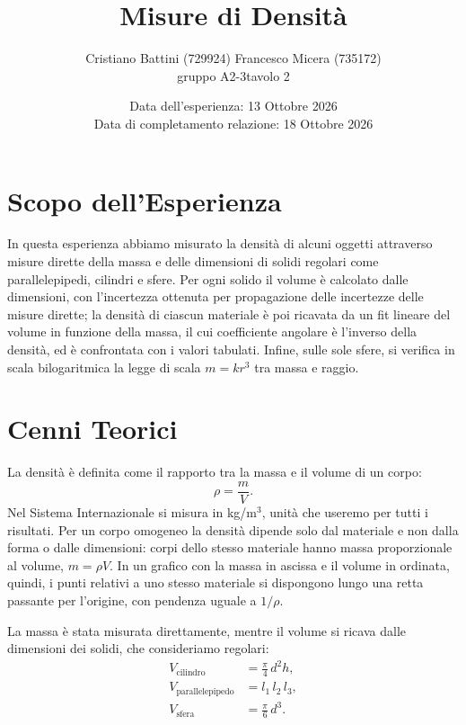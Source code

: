 \documentclass[a4paper]{article}
\title{Misure di Densit\`a}
\author{Cristiano Battini (729924)\quad
        \vspace{3mm}
        Francesco Micera (735172)\\
        gruppo A2-3\quad tavolo 2}
\date{Data dell'esperienza: 13 Ottobre 2026\\
      Data di completamento relazione: 18 Ottobre 2026}
\begin{document}
\maketitle
\section{Scopo dell'Esperienza}
In questa esperienza abbiamo misurato la densit\`a di alcuni oggetti attraverso misure dirette della massa e delle dimensioni di solidi regolari come parallelepipedi, cilindri e sfere. Per ogni solido il volume è calcolato dalle dimensioni, con l’incertezza ottenuta per propagazione delle incertezze delle misure dirette; la densità di ciascun materiale è poi ricavata da un fit lineare del volume in funzione della massa, il cui coefficiente angolare è l’inverso della densità, ed è confrontata con i valori tabulati. Infine, sulle sole sfere, si verifica in scala bilogaritmica la legge di scala $m=kr^3$ tra massa e raggio.

\section{Cenni Teorici}\label{cenni_teorici}
La densit\`a \`e definita come il rapporto tra la massa e il volume di un corpo:
\begin{equation}
    \rho = \frac{m}{V}.
    \label{eq:densita}
\end{equation}
Nel Sistema Internazionale si misura in kg/m$^3$, unit\`a che useremo per tutti i risultati.
Per un corpo omogeneo la densit\`a dipende solo dal materiale e non dalla forma o dalle dimensioni: corpi dello stesso materiale hanno massa proporzionale al volume, $m = \rho V$.
In un grafico con la massa in ascissa e il volume in ordinata, quindi, i punti relativi a uno stesso materiale si dispongono lungo una retta passante per l'origine, con pendenza uguale a $1/\rho$.

La massa \`e stata misurata direttamente, mentre il volume si ricava dalle dimensioni dei solidi, che consideriamo regolari:
\begin{align}
    V_{\text{cilindro}} &= \frac{\pi}{4}\, d^2 h, \label{eq:V_cil}\\
    V_{\text{parallelepipedo}} &= l_1\, l_2\, l_3, \label{eq:V_par}\\
    V_{\text{sfera}} &= \frac{\pi}{6}\, d^3. \label{eq:V_sfe}
\end{align}
\end{document}
